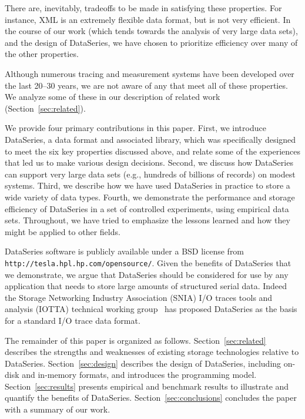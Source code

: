 \documentclass{acm_proc_article-sp}
\begin{document}
There are, inevitably, tradeoffs to be made in satisfying these properties. For
instance, XML is an extremely flexible data format, but is not very
efficient. In the course of our work (which tends towards the analysis
of very large data sets), and the design of DataSeries, we have chosen
to prioritize efficiency over many of the other properties.

Although numerous tracing and measurement systems have been developed
over the last 20--30 years, we are not aware of any that meet all of
these properties. We analyze some of these in our description of
related work (Section~\ref{sec:related}).

We provide four primary contributions in this paper.  First, we
introduce DataSeries, a data format and associated library, which was
specifically designed to meet the six key properties discussed above,
and relate some of the experiences that led us to make various
design decisions. 
Second, we discuss how DataSeries can support very large data sets
(e.g., hundreds of billions of records) on modest systems.  Third, we
describe how we have used DataSeries in practice to store a wide
variety of data types.  Fourth, we demonstrate the performance and
storage efficiency of DataSeries in a set of controlled experiments,
using empirical data sets. Throughout, we have tried to emphasize the
lessons learned and how they might be applied to other fields.

DataSeries software is publicly available under a BSD license from \texttt{http://tesla.hpl.hp.com/opensource/}. Given the benefits of DataSeries that we demonstrate, we
argue that DataSeries should be considered for use by any application
that needs to store large amounts of structured serial data. Indeed
the Storage Networking Industry Association (SNIA) I/O traces tools
and analysis (IOTTA) technical working group~\cite{iotta-website} has
proposed DataSeries as the basis for a standard I/O trace data format.

The remainder of this paper is organized as follows.
Section~\ref{sec:related} describes the strengths and weaknesses of
existing storage technologies relative to DataSeries.
Section~\ref{sec:design} describes the design of DataSeries, including
on-disk and in-memory formats, and introduces the programming model.
Section~\ref{sec:results} presents empirical and benchmark results
to illustrate and quantify the benefits of
DataSeries. Section~\ref{sec:conclusions} concludes the
paper with a summary of our work.
\end{document}
